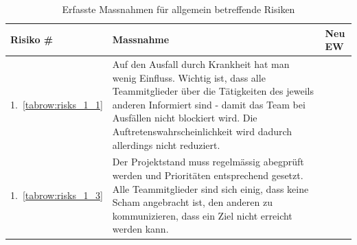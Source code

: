 \documentclass[main.tex]{subfiles} %
\begin{document}
\begin{table}[H]
    \begin{tabularx}{\textwidth}{|>{\centering\arraybackslash}p{2cm}|>{\raggedright\arraybackslash}X|>{\centering\arraybackslash}p{0.75cm}|}
        \hline
        \textbf{Risiko \#}        & \textbf{Massnahme}
                                  & \textbf{Neu EW}                                                                                                                                                                                                                                                                       \\
        \hline
        \rowcolor{yellow!30}
        1.~\ref{tabrow:risks_1_1} & Auf den Ausfall durch Krankheit hat man wenig Einfluss. Wichtig ist, dass alle Teammitglieder über die Tätigkeiten des jeweils anderen Informiert sind - damit das Team bei Ausfällen nicht blockiert wird. Die Auftretenswahrscheinlichkeit wird dadurch allerdings nicht reduziert.
                                  & 2                                                                                                                                                                                                                                                                                     \\
        \hline
        \rowcolor{green!30}
        1.~\ref{tabrow:risks_1_3} & Der Projektstand muss regelmässig abegprüft werden und Prioritäten entsprechend gesetzt. Alle Teammitglieder sind sich einig, dass keine Scham angebracht ist, den anderen zu kommunizieren, dass ein Ziel nicht erreicht werden kann.
                                  & 1                                                                                                                                                                                                                                                                                     \\
        \hline
    \end{tabularx}
    \caption{Erfasste Massnahmen für allgemein betreffende Risiken}~\label{tab:Erfasste_Massnahmen_allg}
\end{table}
\end{document}
